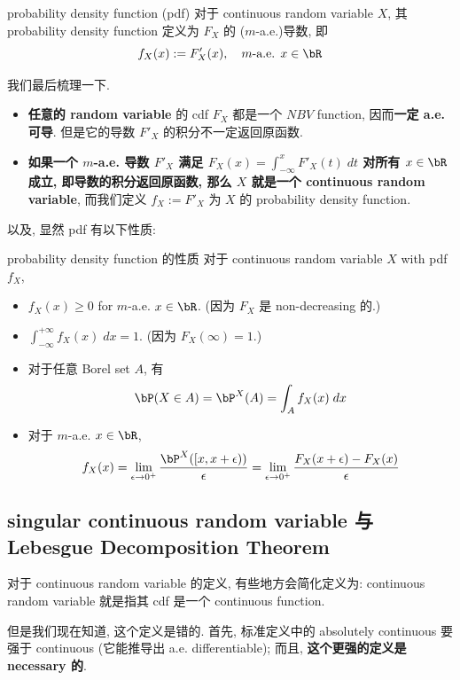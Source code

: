 \begin{definition}{probability density function (pdf)}\label{probability density function}
    对于 continuous random variable \(X\), 其 probability density function 定义为 \(F_X\) 的 (\(m\)-a.e.)导数, 
    即
    \[
    f_X(x) := F'_X(x), \quad m\text{-a.e. } x \in \bR
    \]
\end{definition}
我们最后梳理一下.
\begin{itemize}
    \item \textbf{任意的 random variable} 的 cdf \(F_X\) 都是一个 \(NBV\) function, 因而\textbf{一定 a.e. 可导}.
     但是它的导数 \(F'_X\) 的积分不一定返回原函数.
    \item \textbf{如果一个 \(m\)-a.e. 导数 \(F'_X\) 满足 \(F_X(x) = \int_{-\infty}^x F'_X(t) \;dt\)
     对所有 \(x \in \bR\) 成立, 即导数的积分返回原函数, 那么 \(X\) 就是一个 continuous random variable}, 
     而我们定义 \(f_X := F'_X\) 为 \(X\) 的 probability density function.
\end{itemize}

以及, 显然 pdf 有以下性质:
\begin{proposition}{probability density function 的性质}
    对于 continuous random variable \(X\) with pdf \(f_X\), 
    \begin{itemize}
        \item \(f_X(x) \geq 0\) for \(m\)-a.e. \(x \in \bR\). (因为 \(F_X\) 是 non-decreasing 的.)
        \item \(\int_{-\infty}^{+\infty} f_X(x) \;dx = 1\). (因为 \(F_X(\infty) = 1\).)
        \item 对于任意 Borel set \(A\), 有 \[\bP(X\in A) =    \bP^X(A) = \int_A f_X(x) \;dx\]
        \item 对于 \(m\)-a.e. \(x \in \bR\), \[f_X(x) = \lim_{\epsilon \to 0^+} \frac{\bP^X([x, x+\epsilon))}{\epsilon} = 
        \lim_{\epsilon \to 0^+} \frac{F_X(x+\epsilon) - F_X(x)}{\epsilon}\]
    \end{itemize}
    
\end{proposition}

\subsection{singular continuous random variable 与 Lebesgue Decomposition Theorem}
对于 continuous random variable 的定义, 有些地方会简化定义为: continuous random variable 就是指其 cdf 是一个 continuous function.

但是我们现在知道, 这个定义是错的. 
首先, 标准定义中的 absolutely continuous 要强于 continuous (它能推导出 a.e. differentiable); 
而且, \textbf{这个更强的定义是 necessary 的}.

